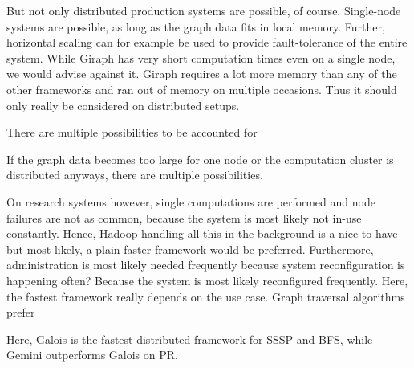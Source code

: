 But not only distributed production systems are possible, of course.  Single-node systems are possible, as long as the graph data fits in local memory. 
Further, horizontal scaling can for example be used to provide fault-tolerance of the entire system.
While Giraph has very short computation times even on a single node, we would advise against it. Giraph requires a lot more memory than any of the other frameworks and ran out of memory on multiple occasions. Thus it should only really be considered on distributed setups.
























There are multiple possibilities to be accounted for



If the graph data becomes too large for one node or the computation cluster is distributed anyways, there are multiple possibilities.



On research systems however, single computations are performed and node failures are not as common, because the system is most likely not in-use constantly.
Hence, Hadoop handling all this in the background is a nice-to-have but most likely, a plain faster framework would be preferred.
Furthermore, administration is most likely needed frequently because system reconfiguration is happening often?
Because the system is most likely reconfigured frequently.
Here, the fastest framework really depends on the use case. Graph traversal algorithms prefer

Here, Galois is the fastest distributed framework for SSSP and BFS, while Gemini outperforms Galois on PR.












